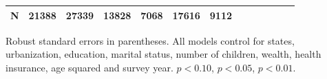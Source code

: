 \documentclass[12pt,english]{article}
\begin{document}
\begin{table}[!ht]
\begin{center}
\begin{adjustbox}{max width=\linewidth}
\begin{threeparttable}
{\begin{tabular}{l*{6}{S S}}
						\midrule
						N         &    21388         &    27339         &    13828         &     7068         &    17616         &     9112         \\
						\bottomrule
					\end{tabular}
					\begin{tablenotes}
						\item \footnotesize  Robust standard errors in parentheses. All models control for  states, urbanization, education, marital status, number of children, wealth, health insurance, age squared and survey year. \sym{*} \(p<0.10\), \sym{**} \(p<0.05\), \sym{***} \(p<0.01\).
					\end{tablenotes}
				}
			\end{threeparttable}
		\end{adjustbox}
	\end{center}
\end{table} 
\clearpage
\end{document}
